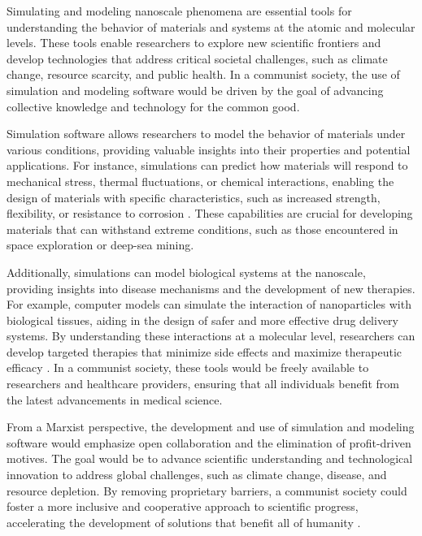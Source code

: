Simulating and modeling nanoscale phenomena are essential tools for understanding the behavior of materials and systems at the atomic and molecular levels. These tools enable researchers to explore new scientific frontiers and develop technologies that address critical societal challenges, such as climate change, resource scarcity, and public health. In a communist society, the use of simulation and modeling software would be driven by the goal of advancing collective knowledge and technology for the common good.

Simulation software allows researchers to model the behavior of materials under various conditions, providing valuable insights into their properties and potential applications. For instance, simulations can predict how materials will respond to mechanical stress, thermal fluctuations, or chemical interactions, enabling the design of materials with specific characteristics, such as increased strength, flexibility, or resistance to corrosion \cite[pp.~65-73]{meyer2004nanotechnology}. These capabilities are crucial for developing materials that can withstand extreme conditions, such as those encountered in space exploration or deep-sea mining.

Additionally, simulations can model biological systems at the nanoscale, providing insights into disease mechanisms and the development of new therapies. For example, computer models can simulate the interaction of nanoparticles with biological tissues, aiding in the design of safer and more effective drug delivery systems. By understanding these interactions at a molecular level, researchers can develop targeted therapies that minimize side effects and maximize therapeutic efficacy \cite[pp.~180-188]{ratner2003nanotechnology}. In a communist society, these tools would be freely available to researchers and healthcare providers, ensuring that all individuals benefit from the latest advancements in medical science.

From a Marxist perspective, the development and use of simulation and modeling software would emphasize open collaboration and the elimination of profit-driven motives. The goal would be to advance scientific understanding and technological innovation to address global challenges, such as climate change, disease, and resource depletion. By removing proprietary barriers, a communist society could foster a more inclusive and cooperative approach to scientific progress, accelerating the development of solutions that benefit all of humanity \cite[pp.~205-212]{drexler1986engines}.

